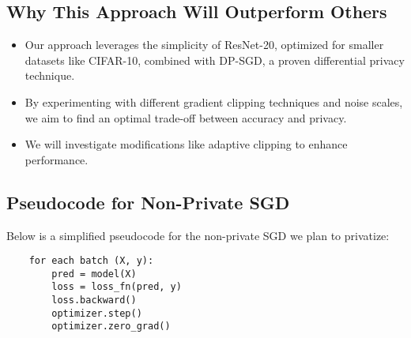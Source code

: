 \subsection{Why This Approach Will Outperform Others}\label{subsec:why-this-approach-will-outperform-others}
\begin{itemize}
    \item Our approach leverages the simplicity of ResNet-20, optimized for smaller datasets like CIFAR-10,
    combined with DP-SGD, a proven differential privacy technique.
    \item By experimenting with different gradient clipping techniques and noise scales,
    we aim to find an optimal trade-off between accuracy and privacy.
    \item We will investigate modifications like adaptive clipping to enhance performance.
\end{itemize}

\subsection{Pseudocode for Non-Private SGD}\label{subsec:pseudo-code-for-non-private-sgd}
Below is a simplified pseudocode for the non-private SGD we plan to privatize:
\begin{verbatim}
    for each batch (X, y):
        pred = model(X)
        loss = loss_fn(pred, y)
        loss.backward()
        optimizer.step()
        optimizer.zero_grad()
\end{verbatim}